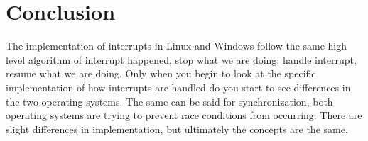 \documentclass[10pt,serif,draftclsnofoot,onecolumn]{IEEEtran}
\begin{document}
	\section{Conclusion}
	\par
			The implementation of interrupts in Linux and Windows follow the same high level algorithm of interrupt happened, stop what we are doing, handle interrupt, resume what we are doing. Only when you begin to look at the specific implementation of how interrupts are handled do you start to see differences in the two operating systems. The same can be said for synchronization, both operating systems are trying to prevent race conditions from occurring. There are slight differences in implementation, but ultimately the concepts are the same. 
	\newpage


	
	
\end{document}
